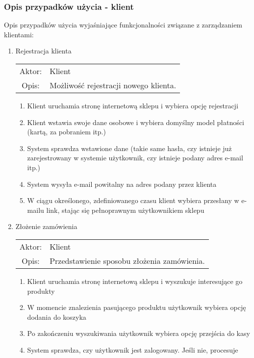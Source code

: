 \subsubsection{Opis przypadków użycia - klient}

Opis przypadków użycia wyjaśniające funkcjonalności związane z zarządzaniem
klientami:

\begin{enumerate}
  \item Rejestracja klienta \\
  \begin{tabularx}{\linewidth}{ c X }
  Aktor: & Klient \\
  Opis: & Możliwość rejestracji nowego klienta.\\
  \end{tabularx}
   \begin{enumerate}
    \item Klient uruchamia stronę internetową sklepu i wybiera opcję rejestracji
    \item Klient wstawia swoje dane osobowe i wybiera domyślny model płatności
    (kartą, za pobraniem itp.)
    \item System sprawdza wstawione dane (takie same hasła, czy istnieje już
    zarejestrowany w systemie użytkownik, czy istnieje podany adres e-mail itp.)
    \item System wysyła e-mail powitalny na adres podany przez klienta
    \item W ciągu określonego, zdefiniowanego czasu klient wybiera przesłany w
    e-mailu link, stając się pełnoprawnym użytkownikiem sklepu
  \end{enumerate}
  \item Złożenie zamówienia \\
  \begin{tabularx}{\linewidth}{ c X }
  Aktor: & Klient \\
  Opis: & Przedstawienie sposobu złożenia zamówienia.\\
  \end{tabularx}
  \begin{enumerate}
    \item Klient uruchamia stronę internetową sklepu i wyszukuje interesujące go
    produkty
    \item W momencie znalezienia pasującego produktu użytkownik wybiera opcję
    dodania do koszyka
    \item Po zakończeniu wyszukiwania użytkownik wybiera opcję przejścia do kasy
    \item System sprawdza, czy użytkownik jest zalogowany. Jeśli nie, procesuje

\end{enumerate}
\end{enumerate}
